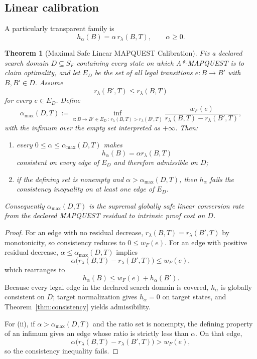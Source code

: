 \documentclass[11pt]{article}
\newtheorem{theorem}{Theorem}[section]
\theoremstyle{definition}
\theoremstyle{remark}
\begin{document}
\subsection{Linear calibration}

A particularly transparent family is
\[
h_\alpha(B)=\alpha\,r_\lambda(B,T),\qquad \alpha\ge0.
\]

\begin{theorem}[Maximal Safe Linear MAPQUEST Calibration]\label{thm:alpha-max}
Fix a declared search domain $D\subseteq S_F$ containing every state on which A*-MAPQUEST is to claim optimality, and let $E_D$ be the set of all legal transitions $e:B\to B'$ with $B,B'\in D$. Assume
\[
r_\lambda(B',T)\le r_\lambda(B,T)
\]
for every $e\in E_D$. Define
\[
\alpha_{\max}(D,T)
:=
\inf_{e:B\to B'\in E_D\,:\,r_\lambda(B,T)>r_\lambda(B',T)}
\frac{w_F(e)}{r_\lambda(B,T)-r_\lambda(B',T)},
\]
with the infimum over the empty set interpreted as $+\infty$. Then:
\begin{enumerate}[label=(\roman*)]
\item every $0\le\alpha\le\alpha_{\max}(D,T)$ makes
\[
h_\alpha(B)=\alpha r_\lambda(B,T)
\]
consistent on every edge of $E_D$ and therefore admissible on $D$;
\item if the defining set is nonempty and $\alpha>\alpha_{\max}(D,T)$, then $h_\alpha$ fails the consistency inequality on at least one edge of $E_D$.
\end{enumerate}
Consequently $\alpha_{\max}(D,T)$ is the supremal globally safe linear conversion rate from the declared MAPQUEST residual to intrinsic proof cost on $D$.
\end{theorem}

\begin{proof}
For an edge with no residual decrease, $r_\lambda(B,T)=r_\lambda(B',T)$ by monotonicity, so consistency reduces to $0\le w_F(e)$. For an edge with positive residual decrease, $\alpha\le\alpha_{\max}(D,T)$ implies
\[
\alpha\bigl(r_\lambda(B,T)-r_\lambda(B',T)\bigr)\le w_F(e),
\]
which rearranges to
\[
h_\alpha(B)\le w_F(e)+h_\alpha(B').
\]
Because every legal edge in the declared search domain is covered, $h_\alpha$ is globally consistent on $D$; target normalization gives $h_\alpha=0$ on target states, and Theorem~\ref{thm:consistency} yields admissibility.

For (ii), if $\alpha>\alpha_{\max}(D,T)$ and the ratio set is nonempty, the defining property of an infimum gives an edge whose ratio is strictly less than $\alpha$. On that edge,
\[
\alpha\bigl(r_\lambda(B,T)-r_\lambda(B',T)\bigr)>w_F(e),
\]
so the consistency inequality fails.
\end{proof}
\end{document}
